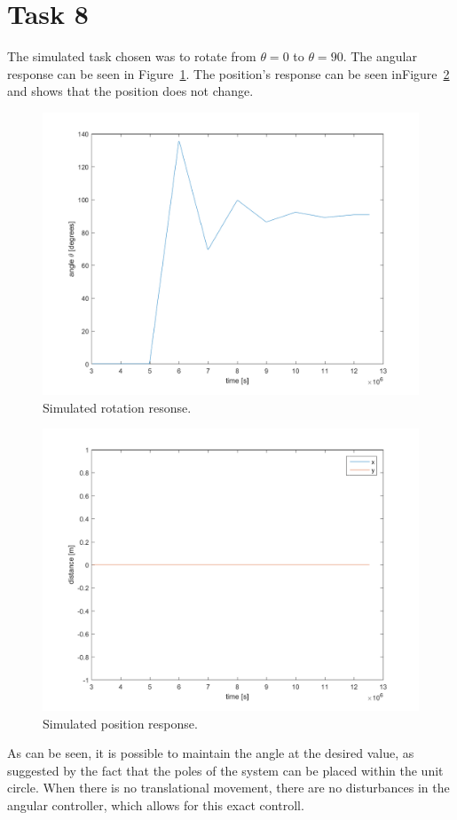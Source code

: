 \documentclass[a4paper,12pt,oneside,onecolumn]{article} %
\begin{document}
\section*{Task 8}
    The simulated task chosen was to rotate from $\theta = 0$ to $\theta = 90$.
    The angular response can be seen in Figure~\ref{fig:task8_angleplot}. The
    position's response can be seen inFigure~\ref{fig:task8_posplot} and shows
    that the position does not change.  \begin{figure}[H]
        \centering
        \includegraphics[scale = 0.5]{../matlab/images/task8_angleplot.png}
        \caption{Simulated rotation resonse.}
        \label{fig:task8_angleplot}
    \end{figure}
    \begin{figure}[H]
        \centering
        \includegraphics[scale = 0.5]{../matlab/images/task8_posplot.png}
        \caption{Simulated position response.}
        \label{fig:task8_posplot}
    \end{figure}
As can be seen, it is possible to maintain the angle at the desired value, as suggested by the fact that the poles of the system can be placed within the unit circle. When there is no translational movement, there are no disturbances in the angular controller, which allows for this exact controll.
\end{document}

